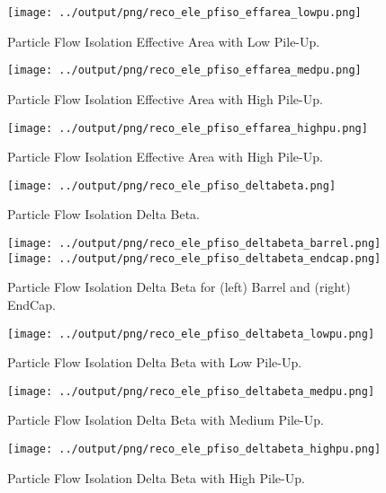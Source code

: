 \documentclass[11pt]{book}
\begin{document}
\begin{figure}[ht]
\centering
\texttt{[image: ../output/png/reco\_ele\_pfiso\_effarea\_lowpu.png]}
\caption{Particle Flow Isolation Effective Area with Low Pile-Up.}
\label{fig:reco_ele_pfiso_effarea_lowpu}
\end{figure}

\begin{figure}[ht]
\centering
\texttt{[image: ../output/png/reco\_ele\_pfiso\_effarea\_medpu.png]}
\caption{Particle Flow Isolation Effective Area with High Pile-Up.}
\label{fig:reco_ele_pfiso_effarea_medpu}
\end{figure}

\begin{figure}[ht]
\centering
\texttt{[image: ../output/png/reco\_ele\_pfiso\_effarea\_highpu.png]}
\caption{Particle Flow Isolation Effective Area with High Pile-Up.}
\label{fig:reco_ele_pfiso_effarea_highpu}
\end{figure}

\begin{figure}[ht]
\centering
\texttt{[image: ../output/png/reco\_ele\_pfiso\_deltabeta.png]}
\caption{Particle Flow Isolation Delta Beta.}
\label{fig:reco_ele_pfiso_deltabeta}
\end{figure}

\begin{figure}[ht]
\centering
\texttt{[image: ../output/png/reco\_ele\_pfiso\_deltabeta\_barrel.png]}
\texttt{[image: ../output/png/reco\_ele\_pfiso\_deltabeta\_endcap.png]}
\caption{Particle Flow Isolation Delta Beta for (left) Barrel and (right) EndCap.}
\label{fig:reco_ele_pfiso_deltabeta_regions}
\end{figure}

\begin{figure}[ht]
\centering
\texttt{[image: ../output/png/reco\_ele\_pfiso\_deltabeta\_lowpu.png]}
\caption{Particle Flow Isolation Delta Beta with Low Pile-Up.}
\label{fig:reco_ele_pfiso_deltabeta_lowpu}
\end{figure}

\begin{figure}[ht]
\centering
\texttt{[image: ../output/png/reco\_ele\_pfiso\_deltabeta\_medpu.png]}
\caption{Particle Flow Isolation Delta Beta with Medium Pile-Up.}
\label{fig:reco_ele_pfiso_deltabeta_medpu}
\end{figure}

\begin{figure}[ht]
\centering
\texttt{[image: ../output/png/reco\_ele\_pfiso\_deltabeta\_highpu.png]}
\caption{Particle Flow Isolation Delta Beta with High Pile-Up.}
\label{fig:reco_ele_pfiso_deltabeta_highpu}
\end{figure}
\clearpage
\end{document}

